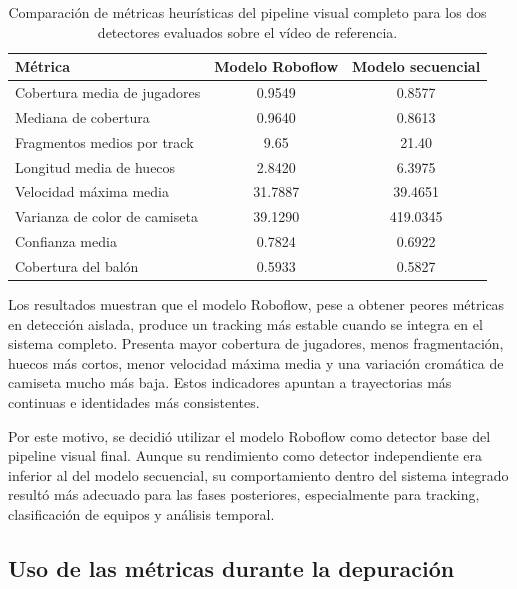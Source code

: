 \begin{table}[htbp]
    \centering
    \scriptsize
    \begin{tabular}{p{4.6cm}|c|c}
        \textbf{Métrica} & \textbf{Modelo Roboflow} & \textbf{Modelo secuencial} \\
        \hline\hline
        Cobertura media de jugadores & 0.9549 & 0.8577 \\
        Mediana de cobertura & 0.9640 & 0.8613 \\
        Fragmentos medios por track & 9.65 & 21.40 \\
        Longitud media de huecos & 2.8420 & 6.3975 \\
        Velocidad máxima media & 31.7887 & 39.4651 \\
        Varianza de color de camiseta & 39.1290 & 419.0345 \\
        Confianza media & 0.7824 & 0.6922 \\
        Cobertura del balón & 0.5933 & 0.5827 \\
        \hline
    \end{tabular}
    \caption[Comparación heurística de detectores dentro del pipeline]{
    Comparación de métricas heurísticas del pipeline visual completo para los dos detectores evaluados sobre el vídeo de referencia.
    }
    \label{tab:comparacion-modelos-pipeline}
\end{table}

Los resultados muestran que el modelo Roboflow, pese a obtener peores métricas en detección aislada, produce un tracking más estable cuando se integra en el sistema completo. Presenta mayor cobertura de jugadores, menos fragmentación, huecos más cortos, menor velocidad máxima media y una variación cromática de camiseta mucho más baja. Estos indicadores apuntan a trayectorias más continuas e identidades más consistentes.

Por este motivo, se decidió utilizar el modelo Roboflow como detector base del pipeline visual final. Aunque su rendimiento como detector independiente era inferior al del modelo secuencial, su comportamiento dentro del sistema integrado resultó más adecuado para las fases posteriores, especialmente para tracking, clasificación de equipos y análisis temporal.

\subsection{Uso de las métricas durante la depuración}

